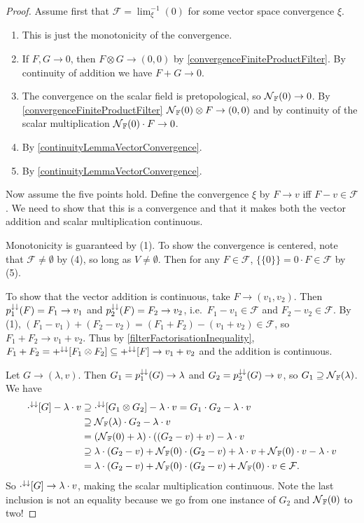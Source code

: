 \begin{proof}
Assume first that $\mathcal{F} = \lim^{-1}_\xi(0)$ for some vector space convergence $\xi$.
\begin{enumerate}
\item This is just the monotonicity of the convergence.
\item If $F,G\to 0$, then $F\otimes G \to (0,0)$ by \ref{convergenceFiniteProductFilter}. By continuity of addition we have $F+G\to 0$.
\item The convergence on the scalar field is pretopological, so $\operatorname{\mathcal{N}}_{\mathbb{F}}(0)\to 0$. By \ref{convergenceFiniteProductFilter} $\operatorname{\mathcal{N}}_{\mathbb{F}}(0)\otimes F \to (0,0)$ and by continuity of the scalar multiplication $\operatorname{\mathcal{N}}_{\mathbb{F}}(0)\cdot F \to 0$.
\item By \ref{continuityLemmaVectorConvergence}.
\item By \ref{continuityLemmaVectorConvergence}.
\end{enumerate}

Now assume the five points hold. Define the convergence $\xi$ by $F\to v$ iff $F-v \in \mathcal{F}$. We need to show that this is a convergence and that it makes both the vector addition and scalar multiplication continuous.

Monotonicity is guaranteed by (1). To show the convergence is centered, note that $\mathcal{F} \neq \emptyset$ by (4), so long as $V\neq \emptyset$. Then for any $F\in \mathcal{F}$, $\big\{\{0\}\big\} = 0\cdot F \in \mathcal{F}$ by (5).

To show that the vector addition is continuous, take $F\to (v_1, v_2)$. Then $p_1^{\downarrow\downarrow}(F) = F_1\to v_1$ and $p_2^{\downarrow\downarrow}(F) = F_2 \to v_2$, i.e.\ $F_1-v_1 \in \mathcal{F}$ and $F_2-v_2 \in \mathcal{F}$. By (1), $(F_1-v_1) + (F_2-v_2) = (F_1+F_2) - (v_1 + v_2) \in \mathcal{F}$, so $F_1+F_2 \to v_1 + v_2$. Thus by \ref{filterFactorisationInequality}, $F_1+F_2 = +^{\downarrow\downarrow}[F_1\otimes F_2] \subseteq +^{\downarrow\downarrow}[F] \to v_1+v_2$ and the addition is continuous.

Let $G \to (\lambda, v)$. Then $G_1 = p_1^{\downarrow\downarrow}(G) \to \lambda$ and $G_2 = p_2^{\downarrow\downarrow}(G) \to v$, so $G_1 \supseteq \operatorname{\mathcal{N}}_{\mathbb{F}}(\lambda)$. We have
\begin{align*}
\cdot^{\downarrow\downarrow}[G] - \lambda\cdot v &\supseteq \cdot^{\downarrow\downarrow}[G_1\otimes G_2] - \lambda\cdot v = G_1\cdot G_2 - \lambda\cdot v \\
&\supseteq \operatorname{\mathcal{N}}_{\mathbb{F}}(\lambda) \cdot G_2 - \lambda\cdot v \\
&= (\operatorname{\mathcal{N}}_{\mathbb{F}}(0) + \lambda)\cdot((G_2 - v) + v) - \lambda\cdot v \\
&\supseteq \lambda\cdot (G_2 - v) + \operatorname{\mathcal{N}}_{\mathbb{F}}(0)\cdot(G_2-v) + \lambda\cdot v + \operatorname{\mathcal{N}}_{\mathbb{F}}(0)\cdot v - \lambda\cdot v \\
&= \lambda\cdot (G_2 - v) + \operatorname{\mathcal{N}}_{\mathbb{F}}(0)\cdot(G_2-v) + \operatorname{\mathcal{N}}_{\mathbb{F}}(0)\cdot v \in \mathcal{F}.
\end{align*}
So $\cdot^{\downarrow\downarrow}[G] \to \lambda\cdot v$, making the scalar multiplication continuous. Note the last inclusion is not an equality because we go from one instance of $G_2$ and $\operatorname{\mathcal{N}}_{\mathbb{F}}(0)$ to two!
\end{proof}
